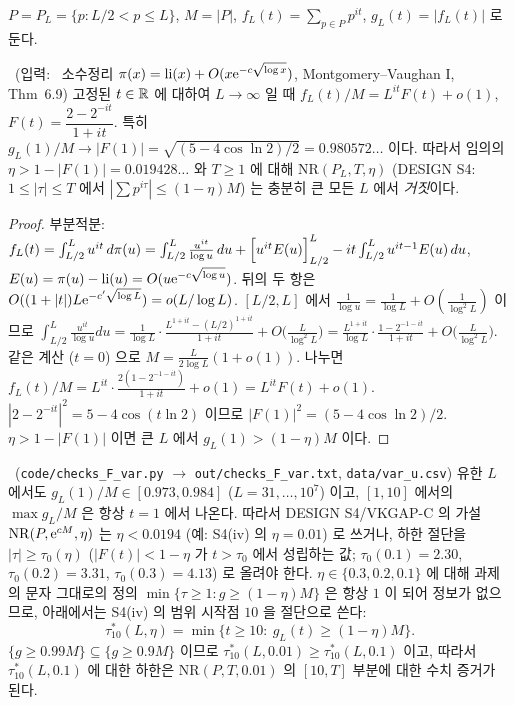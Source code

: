 $P=P_L=\{p: L/2<p\le L\}$, $M=|P|$, $f_L(t)=\sum_{p\in P}p^{it}$, $g_L(t)=|f_L(t)|$ 로 둔다.

\begin{proposition}\label{NUM:prop-t1}
\PROVED\ (입력: \EXT\ 소수정리 $\pi(x)=\mathrm{li}(x)+O(x\mathrm{e}^{-c\sqrt{\log x}})$, Montgomery--Vaughan I, Thm~6.9)
고정된 $t\in\mathbb{R}$ 에 대하여 $L\to\infty$ 일 때 $f_L(t)/M = L^{it}F(t)+o(1)$, $F(t)=\dfrac{2-2^{-it}}{1+it}$.
특히 $g_L(1)/M\to|F(1)|=\sqrt{(5-4\cos\ln2)/2}=0.980572\ldots$ 이다. 따라서 임의의 $\eta>1-|F(1)|=0.019428\ldots$ 와 $T\ge1$ 에 대해
$\mathrm{NR}(P_L,T,\eta)$ (DESIGN S4: $1\le|\tau|\le T$ 에서 $|\sum p^{i\tau}|\le(1-\eta)M$) 는 충분히 큰 모든 $L$ 에서 \emph{거짓}이다.
\end{proposition}
\begin{proof}
부분적분: $f_L(t)=\int_{L/2}^{L}u^{it}\,d\pi(u)=\int_{L/2}^{L}\frac{u^{it}}{\log u}\,du+\Bigl[u^{it}E(u)\Bigr]_{L/2}^{L}-it\int_{L/2}^{L}u^{it-1}E(u)\,du$,
$E(u)=\pi(u)-\mathrm{li}(u)=O(u\mathrm{e}^{-c\sqrt{\log u}})$. 뒤의 두 항은 $O((1+|t|)L\mathrm{e}^{-c'\sqrt{\log L}})=o(L/\log L)$.
$[L/2,L]$ 에서 $\frac1{\log u}=\frac1{\log L}+O(\frac1{\log^2L})$ 이므로
$\int_{L/2}^{L}\frac{u^{it}}{\log u}du=\frac{1}{\log L}\cdot\frac{L^{1+it}-(L/2)^{1+it}}{1+it}+O\bigl(\frac{L}{\log^2L}\bigr)
=\frac{L^{1+it}}{\log L}\cdot\frac{1-2^{-1-it}}{1+it}+O\bigl(\frac{L}{\log^2L}\bigr)$.
같은 계산 ($t=0$) 으로 $M=\frac{L}{2\log L}(1+o(1))$. 나누면 $f_L(t)/M=L^{it}\cdot\frac{2(1-2^{-1-it})}{1+it}+o(1)=L^{it}F(t)+o(1)$.
$|2-2^{-it}|^2=5-4\cos(t\ln2)$ 이므로 $|F(1)|^2=(5-4\cos\ln 2)/2$. $\eta>1-|F(1)|$ 이면 큰 $L$ 에서 $g_L(1)>(1-\eta)M$ 이다.
\end{proof}

\begin{remark}\label{NUM:rem-t1}
\NUMERIC\ (\texttt{code/checks\_F\_var.py} $\to$ \texttt{out/checks\_F\_var.txt}, \texttt{data/var\_u.csv})
유한 $L$ 에서도 $g_L(1)/M\in[0.973,0.984]$ ($L=31,\dots,10^7$) 이고, $[1,10]$ 에서의 $\max g_L/M$ 은 항상 $t=1$ 에서 나온다.
따라서 DESIGN S4/VKGAP-C 의 가설 $\mathrm{NR}(P,\mathrm{e}^{cM},\eta)$ 는 \emph{$\eta<0.0194$} (예: S4(iv) 의 $\eta=0.01$) 로 쓰거나,
하한 절단을 $|\tau|\ge\tau_0(\eta)$ ($|F(t)|<1-\eta$ 가 $t>\tau_0$ 에서 성립하는 값; $\tau_0(0.1)=2.30$, $\tau_0(0.2)=3.31$, $\tau_0(0.3)=4.13$) 로
올려야 한다. $\eta\in\{0.3,0.2,0.1\}$ 에 대해 과제의 문자 그대로의 정의 $\min\{\tau\ge1:g\ge(1-\eta)M\}$ 은 항상 $1$ 이 되어 정보가 없으므로,
아래에서는 S4(iv) 의 범위 시작점 $10$ 을 절단으로 쓴다:
\[
\tau^*_{10}(L,\eta)=\min\{t\ge10:\ g_L(t)\ge(1-\eta)M\}.
\]
$\{g\ge0.99M\}\subseteq\{g\ge0.9M\}$ 이므로 $\tau^*_{10}(L,0.01)\ge\tau^*_{10}(L,0.1)$ 이고, 따라서 $\tau^*_{10}(L,0.1)$ 에 대한 하한은
$\mathrm{NR}(P,T,0.01)$ 의 $[10,T]$ 부분에 대한 수치 증거가 된다.
\end{remark}

